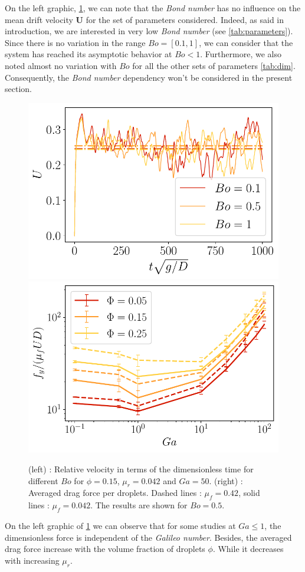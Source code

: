 On the left graphic, \ref{fig:avgF}, we can note that the \textit{Bond number} has no influence on the mean drift velocity $\bm{U}$ for the set of parameters considered.
Indeed, as said in introduction, we are interested in very low \textit{Bond number} (see \ref{tab:parameters}).
Since there is no variation in the range $Bo = [0.1,1]$, we can consider that the system has reached its asymptotic behavior at $Bo<1$.
Furthermore, we also noted almost no variation with $Bo$ for all the other sets of parameters \ref{tab:dim}.
Consequently, the \textit{Bond number} dependency won't be considered in the present section. 
\begin{figure}[h!]
    \centering
    \includegraphics[height=0.22\textheight]{image/N_10/Favg/Bosdep_Ga_50.pdf}
    \includegraphics[height=0.22\textheight]{image/N_10/Favg/F_mu_Bo_0_5.pdf}
    \caption{(left) : Relative velocity in terms of the dimensionless time for different $Bo$ for $\phi = 0.15$, $\mu_r = 0.042$ and $Ga = 50$. (right) : Averaged drag force per droplets. Dashed lines : $\mu_f = 0.42$, solid lines : $\mu_f = 0.042$. The results are shown for $Bo = 0.5$.} 
    \label{fig:avgF}
\end{figure}
On the left graphic of \ref{fig:avgF} we can observe that for some studies at $Ga\le 1$, the dimensionless force is independent of the  \textit{Galileo number}. 
Besides, the averaged drag force increase with the volume fraction of droplets $\phi$.
While it decreases with increasing $\mu_r$. 

